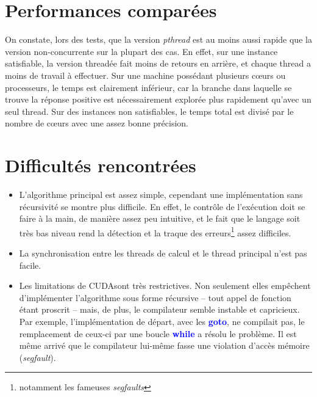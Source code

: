 \documentclass{article}
\newcommand{\keyword}[1]{\textbf{\textcolor{blue}{#1}}}
\newcommand{\cuda}{\textsc{CUDA}}
\begin{document}

\section{Performances comparées}


    On constate, lors des tests, que la version \emph{pthread} est au moins aussi rapide que la version non-concurrente sur la plupart des cas. En effet, sur une instance satisfiable, la version threadée fait moins de retours en arrière, et chaque thread a moins de travail à effectuer. Sur une machine possédant plusieurs cœurs ou processeurs, le temps est clairement inférieur, car la branche dans laquelle se trouve la réponse positive est nécessairement explorée plus rapidement qu'avec un seul thread. Sur des instances non satisfiables, le temps total est divisé par le nombre de cœurs avec une assez bonne précision.

\section{Difficultés rencontrées}
\begin{itemize}
    \item L'algorithme principal est assez simple, cependant une implémentation sans récursivité se montre plus difficile. En effet, le contrôle de l'exécution doit se faire à la main, de manière assez peu intuitive, et le fait que le langage soit très bas niveau rend la détection et la traque des erreurs\footnote{notamment les fameuses \emph{segfaults}} assez difficiles.
    \item La synchronisation entre les threads de calcul et le thread principal n'est pas facile.
    \item Les limitations de \cuda sont très restrictives. Non seulement elles empêchent d'implémenter l'algorithme sous forme récursive -- tout appel de fonction étant proscrit -- mais, de plus, le compilateur semble instable et capricieux. Par exemple, l'implémentation de départ, avec les \keyword{goto}, ne compilait pas, le remplacement de ceux-ci par une boucle \keyword{while} a résolu le problème. Il est même arrivé que le compilateur lui-même fasse une violation d'accès mémoire (\emph{segfault}).
\end{itemize}

\end{document}
